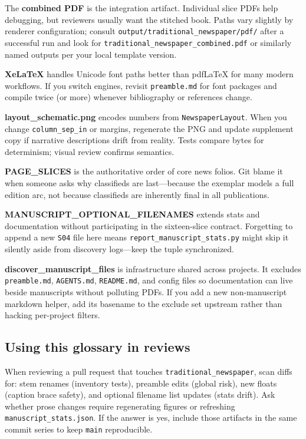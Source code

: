 \documentclass[
]{article}
\begin{document}
The \textbf{combined PDF} is the integration artifact. Individual slice
PDFs help debugging, but reviewers usually want the stitched book. Paths
vary slightly by renderer configuration; consult
\texttt{output/traditional\_newspaper/pdf/} after a successful run and
look for \texttt{traditional\_newspaper\_combined.pdf} or similarly
named outputs per your local template version.

\textbf{XeLaTeX} handles Unicode font paths better than pdfLaTeX for
many modern workflows. If you switch engines, revisit
\texttt{preamble.md} for font packages and compile twice (or more)
whenever bibliography or references change.

\textbf{layout\_schematic.png} encodes numbers from
\texttt{NewspaperLayout}. When you change \texttt{column\_sep\_in} or
margins, regenerate the PNG and update supplement copy if narrative
descriptions drift from reality. Tests compare bytes for determinism;
visual review confirms semantics.

\textbf{PAGE\_SLICES} is the authoritative order of core news folios.
Git blame it when someone asks why classifieds are last---because the
exemplar models a full edition arc, not because classifieds are
inherently final in all publications.

\textbf{MANUSCRIPT\_OPTIONAL\_FILENAMES} extends stats and documentation
without participating in the sixteen-slice contract. Forgetting to
append a new \texttt{S04} file here means
\texttt{report\_manuscript\_stats.py} might skip it silently aside from
discovery logs---keep the tuple synchronized.

\textbf{discover\_manuscript\_files} is infrastructure shared across
projects. It excludes \texttt{preamble.md}, \texttt{AGENTS.md},
\texttt{README.md}, and config files so documentation can live beside
manuscripts without polluting PDFs. If you add a new non-manuscript
markdown helper, add its basename to the exclude set upstream rather
than hacking per-project filters.

\subsection{Using this glossary in
reviews}\label{using-this-glossary-in-reviews}

When reviewing a pull request that touches
\texttt{traditional\_newspaper}, scan diffs for: stem renames (inventory
tests), preamble edits (global risk), new floats (caption brace safety),
and optional filename list updates (stats drift). Ask whether prose
changes require regenerating figures or refreshing
\texttt{manuscript\_stats.json}. If the answer is yes, include those
artifacts in the same commit series to keep \texttt{main} reproducible.
\end{document}
